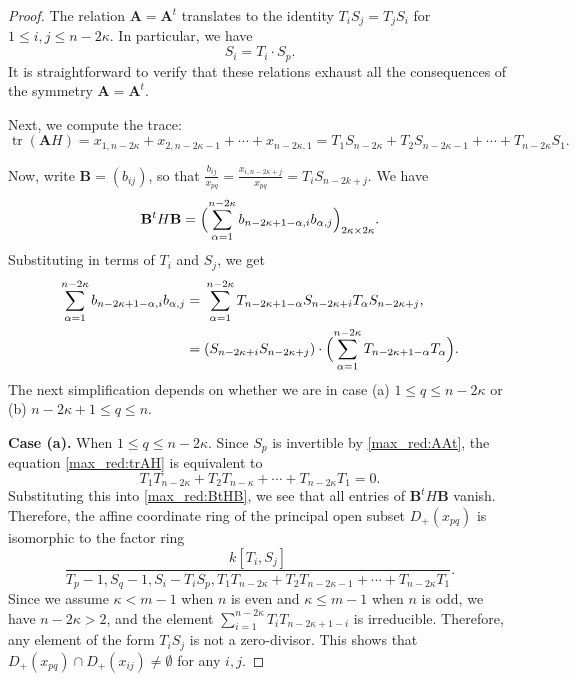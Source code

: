 \documentclass[pdflatex,sn-mathphys-num]{sn-jnl}%
\theoremstyle{thmstyleone}%
\theoremstyle{thmstyletwo}%
\numberwithin{equation}{subsection}
\theoremstyle{thmstylethree}%
\newcommand{\bA}{\ensuremath{\mathbf{A}}\xspace}
\newcommand{\bB}{\ensuremath{\mathbf{B}}\xspace}
\DeclareMathOperator{\tr}{tr}
\begin{document}
\begin{proof}
The relation $\bA=\bA^t$ translates to the identity $T_iS_j=T_jS_i$ for $1\leq i,j\leq n-2\kappa$. 
In particular, we have
\begin{equation}\label{max_red:AAt}
	S_i=T_i\cdot S_p.
\end{equation}
It is straightforward to verify that these relations exhaust all the consequences of the symmetry $\bA=\bA^t$.
				
Next, we compute the trace:
\begin{equation}\label{max_red:trAH}
	\tr(\bA H)=x_{1,n-2\kappa}+x_{2,n-2\kappa-1}+\cdots+x_{n-2\kappa,1}=T_1S_{n-2\kappa}+T_2S_{n-2\kappa-1}+\cdots+T_{n-2\kappa}S_1.
\end{equation}

Now, write $\bB=(b_{ij})$, so that $\frac{b_{ij}}{x_{pq}}=\frac{x_{i,n-2\kappa+j}}{x_{pq}}=T_iS_{n-2k+j}$. We have
\begin{equation*}
	\bB^tH\bB=\Bigl(\sum_{\alpha=1}^{n-2\kappa}b_{n-2\kappa+1-\alpha,i}b_{\alpha,j}\Bigr)_{2\kappa\times 2\kappa}.
\end{equation*}
Substituting in terms of $T_i$ and $S_j$, we get
\begin{align}
\begin{split}\label{max_red:BtHB}
	\sum_{\alpha=1}^{n-2\kappa}b_{n-2\kappa+1-\alpha,i}b_{\alpha,j}={}&\sum_{\alpha=1}^{n-2\kappa} T_{n-2\kappa+1-\alpha} S_{n-2\kappa+i} T_\alpha S_{n-2\kappa+j},\\
	={}  &(S_{n-2\kappa+i}S_{n-2\kappa+j})\cdot \Bigl(\sum_{\alpha=1}^{n-2\kappa} T_{n-2\kappa+1-\alpha}T_\alpha\Bigr).	
\end{split}
\end{align}
The next simplification depends on whether we are in case (a) $1\leq q \leq n-2\kappa$ or (b) $n-2\kappa+1\leq q\leq n$.
	
\noindent\textbf{Case (a).} When $1\leq q\leq n-2\kappa$. 
Since $S_p$ is invertible by \eqref{max_red:AAt}, the equation \eqref{max_red:trAH} is equivalent to
\begin{equation*}
	T_1T_{n-2\kappa}+T_2T_{n-\kappa}+\cdots+T_{n-2\kappa}T_1=0.
\end{equation*}
Substituting this into \eqref{max_red:BtHB}, we see that all entries of $\bB^tH\bB$ vanish. 
Therefore, the affine coordinate ring of the principal open subset $D_+(x_{pq})$ is isomorphic to the factor ring
\begin{equation*}
	\frac{k[T_i,S_j]}{T_p-1,S_q-1,S_i-T_iS_p,T_1T_{n-2\kappa}+T_2T_{n-2\kappa-1}+\cdots+T_{n-2\kappa}T_1}.
\end{equation*}
Since we assume $\kappa<m-1$ when $n$ is even and $\kappa\leq m-1$ when $n$ is odd, we have $n-2\kappa>2$, and the element $\sum_{i=1}^{n-2\kappa}T_iT_{n-2\kappa+1-i}$ is irreducible. Therefore, any element of the form $T_iS_j$ is not a zero-divisor. This shows that $D_+(x_{pq})\cap D_+(x_{ij})\neq\emptyset$ for any $i,j$.
				

\end{proof}
\end{document}
